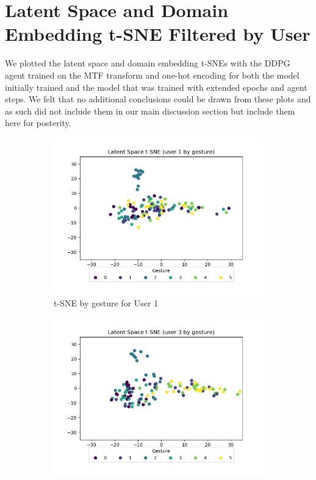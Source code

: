 \chapter{Latent Space and Domain Embedding t-SNE Filtered by User}\label{appendix:tsne}

We plotted the latent space and domain embedding t-SNEs with the DDPG agent trained on the MTF transform and one-hot encoding for both the model initially trained and the model that was trained with extended epochs and agent steps.
We felt that no additional conclusions could be drawn from these plots and as such did not include them in our main discussion section but include them here for posterity.

\begin{figure}[b]
	\centering
	\begin{subfigure}{0.3\textwidth}
		\centering
		\includegraphics[width=\textwidth]{figures/short/short_ls_u1}
		\caption{t-SNE by gesture for User 1}
	\end{subfigure}
	\hfill
	\begin{subfigure}{0.3\textwidth}
		\centering
		\includegraphics[width=\textwidth]{figures/short/short_ls_u3}

\end{subfigure}
\end{figure}
